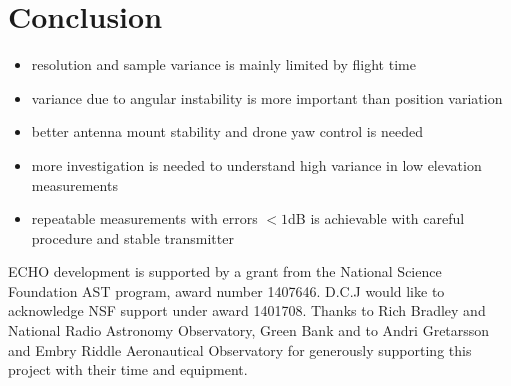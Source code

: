 \documentclass[preprint2,numberedappendix,tighten,twocolappendix]{aastex6}
\begin{document}
\section{Conclusion}
\begin{itemize}
\item resolution and sample variance is mainly limited by flight time
\item variance due to angular instability is more important than position variation
\item better antenna mount stability and drone yaw control is needed
\item more investigation is needed to understand high variance in low elevation measurements
\item repeatable measurements with errors $<1$dB is achievable with careful procedure and stable transmitter

\end{itemize}

\acknowledgments
ECHO development is supported by a grant from the National Science Foundation AST program, award number 1407646. D.C.J would like to acknowledge NSF support  under award 1401708.
Thanks to Rich Bradley and National Radio Astronomy Observatory, Green Bank and to Andri Gretarsson and Embry Riddle Aeronautical Observatory for generously supporting this project with their time and equipment.



\end{document}
